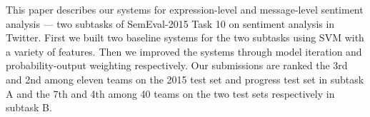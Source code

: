 This paper describes our systems for expression-level and message-level sentiment analysis --- two subtasks of SemEval-2015 Task 10 on sentiment analysis in Twitter. First we built two baseline systems for the two subtasks using SVM with a variety of features. Then we improved the systems through model iteration and probability-output weighting respectively. Our submissions are ranked the 3rd and 2nd among eleven teams on the 2015 test set and progress test set in subtask A and the 7th and 4th among 40 teams on the two test sets respectively in subtask B.
